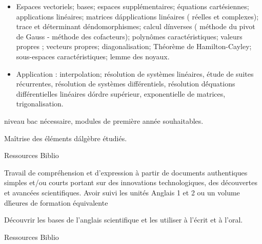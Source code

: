 {
\begin{itemize}
\item Espaces vectoriels; bases; espaces supplémentaires; équations cartésiennes; applications linéaires; matrices d\'applications linéaires ( réelles et complexes); trace et déterminant d\'endomorphismes; calcul d\'inverses ( méthode du pivot de Gauss - méthode des cofacteurs); polynômes caractéristiques; valeurs propres ; vecteurs propres; diagonalisation; Théorème de Hamilton-Cayley; sous-espaces caractéristiques; lemme des noyaux.
\item Application : interpolation; résolution de systèmes linéaires, étude de suites récurrentes, résolution de systèmes différentiels, résolution d\'équations différentielles linéaires d\'ordre supérieur, exponentielle de matrices, trigonalisation. 
\end{itemize} 
} 
{niveau bac nécessaire, modules de première année souhaitables.} 
{\begin{itemize}
 \ObjItem Maîtrise des éléments d\'algèbre étudiés. 
\end{itemize} 
} 
{Ressources} 
{Biblio} 
 
\vfill

{
Travail de compréhension et d’expression à partir de documents authentiques simples et/ou courts portant sur des innovations technologiques, des découvertes et avancées scientifiques.
} 
{Avoir suivi les unités Anglais 1 et 2 ou un volume d\'heures de formation équivalente} 
{\begin{itemize} 
 \ObjItem Découvrir les bases de l’anglais scientifique et les utiliser à l’écrit et à l’oral. 
\end{itemize} 
} 
{Ressources} 
{Biblio} 
 
